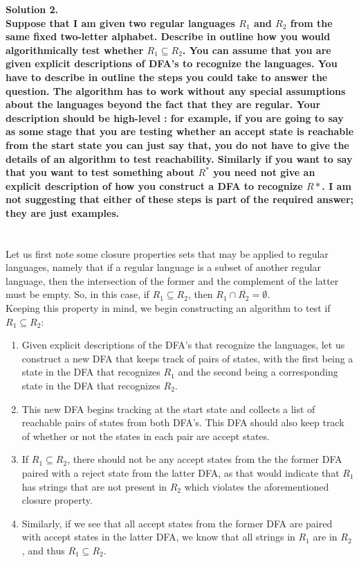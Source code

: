 \documentclass{article}
\begin{document}
\noindent \textbf{Solution 2. 
\\Suppose that I am given two regular languages \(R_1\) and \(R_2\) from the same fixed two-letter alphabet. Describe in outline how you would algorithmically test whether \(R_1 \subseteq R_2\). You can assume that you are given explicit descriptions of DFA's to recognize the languages. You have to describe in outline the steps you could take to answer the question. The algorithm has to work without any special assumptions about the languages beyond the fact that they are regular. Your description should be high-level : for example, if you are going to say as some stage that you are testing whether an accept state is reachable from the start state you can just say that, you do not have to give the details of an algorithm to test reachability. Similarly if you want to say that you want to test something about \(R^*\) you need not give an explicit description of how you construct a DFA to recognize \(R*\). I am not suggesting that either of these steps is part of the required answer; they are just examples.
}
\\
\\
\\\noindent Let us first note some closure properties sets that may be applied to regular languages, namely that if a regular language is a subset of another regular language, then the intersection of the former and the complement of the latter must be empty. So, in this case, if \(R_1 \subseteq R_2\), then \(R_1 \cap \overline{R_2} = \emptyset\). 
\\Keeping this property in mind, we begin constructing an algorithm to test if \(R_1 \subseteq R_2\):
\begin{enumerate}
    \item Given explicit descriptions of the DFA's that recognize the languages, let us construct a new DFA that keeps track of pairs of states, with the first being a state in the DFA that recognizes \(R_1\) and the second being a corresponding state in the DFA that recognizes \(R_2\). 
    \item This new DFA begins tracking at the start state and collects a list of reachable pairs of states from both DFA's. This DFA should also keep track of whether or not the states in each pair are accept states.
    \item If \(R_1 \subseteq R_2\), there should not be any accept states from the the former DFA paired with a reject state from the latter DFA, as that would indicate that \(R_1\) has strings that are not present in \(R_2\) which violates the aforementioned closure property.
    \item Similarly, if we see that all accept states from the former DFA are paired with accept states in the latter DFA, we know that all strings in \(R_1\) are in \(R_2\), and thus \(R_1 \subseteq R_2\).
\end{enumerate}
\\
\\
\end{document}

